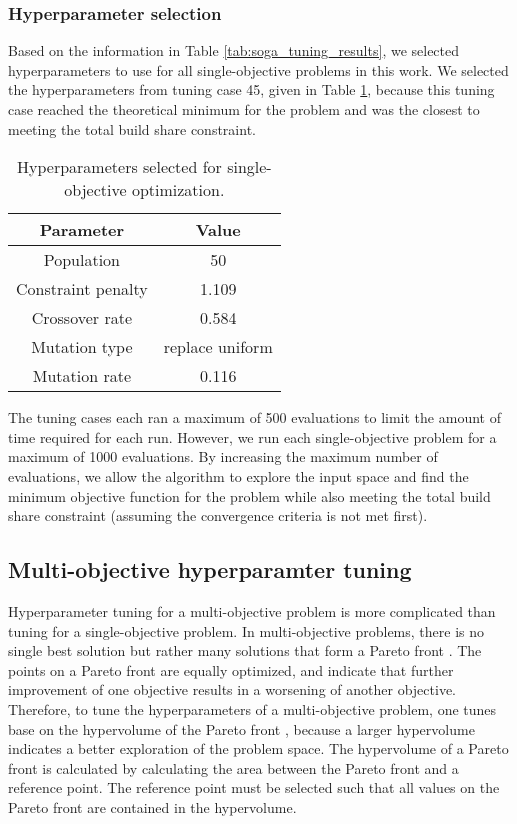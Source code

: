 \subsubsection{Hyperparameter selection}
Based on the information in Table \ref{tab:soga_tuning_results}, we 
selected hyperparameters to use for all single-objective problems in this 
work. We selected the hyperparameters from tuning case 45, given in 
Table \ref{tab:soga_parameters}, because this tuning case reached the 
theoretical minimum for the problem and was the closest to meeting 
the total build share constraint. 

\begin{table}[h!]
    \centering
    \caption{Hyperparameters selected for single-objective optimization.}
    \label{tab:soga_parameters}
    \begin{tabular}{c c}
        \hline
        Parameter & Value \\
        \hline
        Population & 50 \\
        Constraint penalty & 1.109\\
        Crossover rate & 0.584\\
        Mutation type & replace uniform\\
        Mutation rate & 0.116\\
        \hline
    \end{tabular}
\end{table}

The tuning cases each ran a maximum of 500 evaluations to limit the 
amount of time required for each run. However, we run each 
single-objective problem for a maximum of 1000 evaluations. By 
increasing the maximum number of evaluations, we allow the 
algorithm to explore the input space and 
find the minimum objective 
function for the problem while also meeting the total build share 
constraint 
(assuming the convergence criteria is not met first). 

\subsection{Multi-objective hyperparamter tuning}
Hyperparameter tuning for a multi-objective problem is more complicated 
than tuning for a single-objective problem. In multi-objective 
problems, there is no single best solution but rather many solutions 
that form a Pareto front \cite{adams_dakota_2021}. The points on a 
Pareto front are equally optimized, and indicate that further improvement 
of one objective 
results in a worsening of another objective. Therefore, to tune the 
hyperparameters of a multi-objective problem, one tunes base on the 
hypervolume of the Pareto front \cite{deb_multi-objective_2001}, because 
a larger hypervolume indicates a better exploration of the problem space.
The 
hypervolume of a Pareto front is calculated by calculating the area 
between the Pareto front and a reference point. The reference point 
must be selected such that all values on the Pareto front are contained in 
the hypervolume. 

